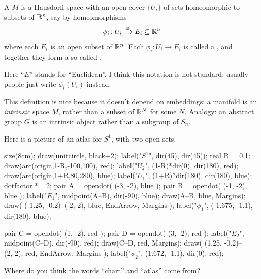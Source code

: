 \begin{definition}
	\label{def:topological_manif}
	A  $M$ is a Hausdorff space
	with an open cover $\{U_i\}$ of sets
	homeomorphic to subsets of $\mathbb R^n$,
	say by homeomorphisms
	\[ \phi_i \colon U_i \xrightarrow{\cong} E_i \subseteq \mathbb R^n \]
	where each $E_i$ is an open subset of $\mathbb R^n$.
	Each $\phi_i \colon U_i \to E_i$ is called a ,
	and together they form a so-called .
\end{definition}
\begin{remark}
	Here ``$E$'' stands for ``Euclidean''.
	I think this notation is not standard; usually
	people just write $\phi_i(U_i)$ instead.
\end{remark}
\begin{remark}
	This definition is nice because it doesn't depend on embeddings:
	a manifold is an \emph{intrinsic} space $M$,
	rather than a subset of $\mathbb R^N$ for some $N$.
	Analogy: an abstract group $G$ is an intrinsic object
	rather than a subgroup of $S_n$.
\end{remark}

\begin{example}[An atlas on $S^1$]
Here is a picture of an atlas for $S^1$, with two open sets.
\begin{center}
	\begin{asy}
		size(8cm);
		draw(unitcircle, black+2);
		label("$S^1$", dir(45), dir(45));
		real R = 0.1;
		draw(arc(origin,1-R,-100,100), red);
		label("$U_2$", (1-R)*dir(0), dir(180), red);
		draw(arc(origin,1+R,80,280), blue);
		label("$U_1$", (1+R)*dir(180), dir(180), blue);
		dotfactor *= 2;
		pair A = opendot( (-3, -2), blue );
		pair B = opendot( (-1, -2), blue );
		label("$E_1$", midpoint(A--B), dir(-90), blue);
		draw(A--B, blue, Margins);
		draw( (-1.25, -0.2)--(-2,-2), blue, EndArrow, Margins );
		label("$\phi_1$", (-1.675, -1.1), dir(180), blue);

		pair C = opendot( (1, -2), red );
		pair D = opendot( (3, -2), red );
		label("$E_2$", midpoint(C--D), dir(-90), red);
		draw(C--D, red, Margins);
		draw( (1.25, -0.2)--(2,-2), red, EndArrow, Margins );
		label("$\phi_2$", (1.672, -1.1), dir(0), red);
	\end{asy}
\end{center}
\end{example}

\begin{ques}
	Where do you think the words ``chart'' and ``atlas'' come from?
\end{ques}

